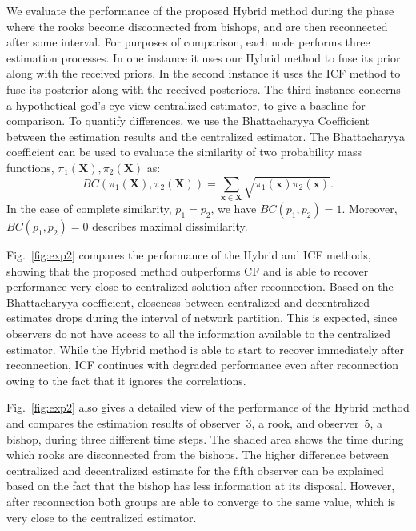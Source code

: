 \documentclass[conference]{IEEEtran}
\newcommand{\vect}[1]{{\mathbf{#1}}}
\theoremstyle{remark}
\begin{document}
We evaluate the performance of the proposed Hybrid method during the phase 
where the rooks become disconnected from bishops, and are then reconnected 
after some interval. For purposes of comparison, each node performs three 
estimation processes. In one instance it uses our Hybrid method to fuse its 
prior along with the received priors. In the second instance it uses the ICF 
method to fuse its posterior along with the received posteriors. The third 
instance concerns a hypothetical god's-eye-view centralized estimator, to give 
a baseline for comparison. To quantify differences, we use the 
Bhattacharyya 
Coefficient \cite{bhattacharyya1946measure} between the estimation results and 
the 
centralized estimator. The Bhattacharyya coefficient can be used to evaluate 
the 
similarity of two probability mass functions, $\pi_1(\vect{X}), 
\pi_2(\vect{X})$ as:
\begin{equation}
\textstyle BC(\pi_1(\vect{X}),\pi_2(\vect{X})) = \sum_{\vect{x}\in 
\vect{X}}\sqrt{\pi_1(\vect{x}) \pi_2(\vect{x})}.
\end{equation}
In the case of complete similarity, $p_1= p_2$, we have $BC(p_1,p_2)=1$. Moreover, 
$BC(p_1,p_2)=0$ describes maximal dissimilarity.

Fig.~\ref{fig:exp2} compares the performance of the Hybrid and ICF methods, 
showing that the proposed method outperforms CF and is able to recover 
performance very close to centralized solution after reconnection.  Based on 
the Bhattacharyya coefficient, closeness between centralized and decentralized 
estimates drops during the interval of network partition. This is expected, 
since observers do not have access to all the information available to the 
centralized estimator. While the Hybrid method is able to start to recover 
immediately after reconnection, ICF continues with degraded performance even 
after reconnection owing to the fact that it ignores the correlations. 

Fig.~\ref{fig:exp2} also gives a detailed view of the performance of the Hybrid 
method and compares the estimation results of observer~3, a rook, and 
observer~5, a bishop, during three different time steps. The shaded area shows 
the time during which rooks are disconnected from the bishops. The higher 
difference between centralized and decentralized estimate for the fifth 
observer can be explained based on the fact that the bishop has less 
information at its disposal. However, after reconnection both groups are able 
to converge to the same value, which is very close to the centralized 
estimator. 
\end{document}
